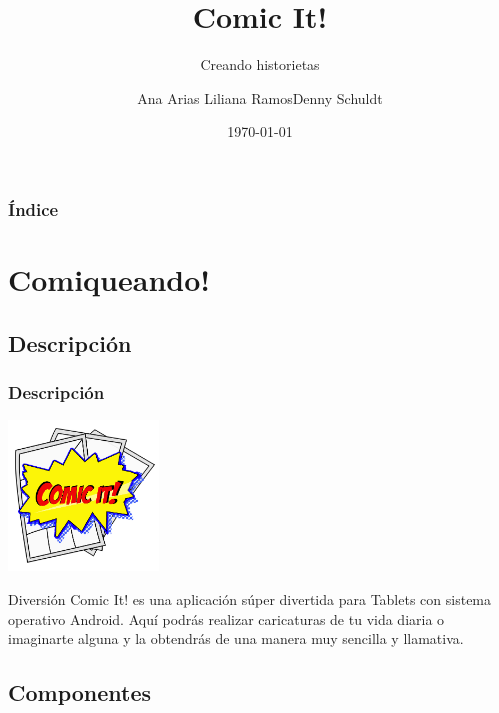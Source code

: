 \documentclass[utf8]{beamer}
\title[Comic It!]{Comic It!}
\subtitle{Creando historietas}
\author[Ana Arias,Liliana Ramos,Denny Schuldt]
{Ana Arias \newline Liliana Ramos\newline Denny Schuldt}
\institute[ESPOL]
{
  Escuela Superior Politécnica del Litoral

}
\date{\today}
\begin{document}
\frame{\titlepage}

\begin{frame}
  \frametitle{Índice}
  \tableofcontents
\end{frame}

\section{Comiqueando!}
\subsection{Descripción}

\begin{frame}
  \frametitle{Descripción}

\begin{center}
		\begingroup
			\includegraphics[width=0.30\textwidth]{imagenes/comicit.jpg}
		\endgroup
	\end{center}

  \begin{block}{Diversión}
Comic It! es una aplicación súper divertida para Tablets con sistema operativo Android. Aquí podrás realizar caricaturas de tu vida diaria o imaginarte alguna y la obtendrás de una manera muy sencilla y llamativa.
  \end{block}
       
 
\end{frame}


\subsection{Componentes}
\end{document}
